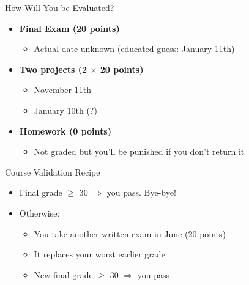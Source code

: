\documentclass[10pt]{beamer}
\begin{document}
\begin{frame}
  \begin{block}{How Will You be Evaluated?}
    \begin{itemize}
    \item \textbf{Final Exam (20 points)} 
      \begin{itemize}
      \item Actual date unknown (educated guess: January 11th)
      \end{itemize}

      \medskip
      
    \item \textbf{Two projects (2 $\times$ 20 points)} 
      \begin{itemize}
      \item November 11th
      \item January 10th (?)
      \end{itemize}
      
      \medskip

    \item \textbf{Homework (0 points)} 
      \begin{itemize}
      \item Not graded but you'll be punished if you don't return it
      \end{itemize}
    \end{itemize}
  \end{block}

  \begin{alertblock}{Course Validation Recipe}
    \begin{itemize}
    \item Final grade $\geq$ 30 $\Longrightarrow$ you pass. Bye-bye!
    \item Otherwise:
      \begin{itemize}
      \item You take another written exam in June (20 points)
      \item It replaces your worst earlier grade
      \item New final grade $\geq$ 30 $\Longrightarrow$ you pass
      \end{itemize}
    \end{itemize}
  \end{alertblock}
\end{frame}

\end{document}
